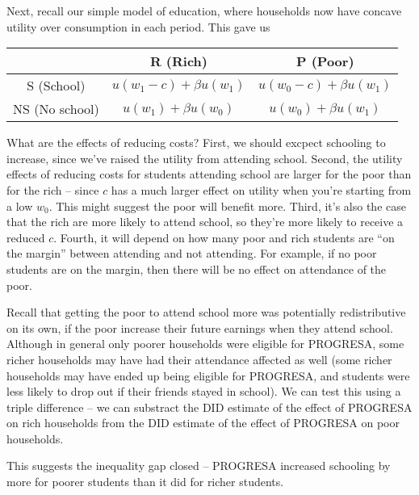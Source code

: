 \documentclass[12pt,english]{article}
\begin{document}
Next, recall our simple model of education, where households now have concave utility over consumption in each period. This gave us
\begin{table}[H]
\centering
\begin{tabular}{c|c|c}
 & R (Rich) & P (Poor) \\
\hline
S (School) & $u(w_{1} - c) + \beta u(w_{1})$ & $u(w_{0} - c) + \beta u(w_{1})$ \\
\hline
NS (No school) & $u(w_{1}) + \beta u(w_{0})$ & $u(w_{0}) + \beta u(w_{1})$  
\end{tabular}
\end{table}
What are the effects of reducing costs? First, we should excpect schooling to increase, since we've raised the utility from attending school. Second, the utility effects of reducing costs for students attending school are larger for the poor than for the rich -- since $c$ has a much larger effect on utility when you're starting from a low $w_{0}$. This might suggest the poor will benefit more. Third, it's also the case that the rich are more likely to attend school, so they're more likely to receive a reduced $c$. Fourth, it will depend on how many poor and rich students are ``on the margin'' between attending and not attending. For example, if no poor students are on the margin, then there will be no effect on attendance of the poor.

Recall that getting the poor to attend school more was potentially redistributive on its own, if the poor increase their future earnings when they attend school. Although in general only poorer households were eligible for PROGRESA, some richer households may have had their attendance affected as well (some richer households may have ended up being eligible for PROGRESA, and students were less likely to drop out if their friends stayed in school). We can test this using a triple difference -- we can substract the DID estimate of the effect of PROGRESA on rich households from the DID estimate of the effect of PROGRESA on poor households.

\vspace{1em}
\vspace{1em}
This suggests the inequality gap closed -- PROGRESA increased schooling by more for poorer students than it did for richer students.
\end{document}
